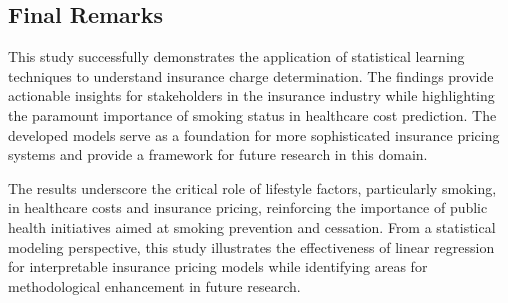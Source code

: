 \documentclass[12pt,a4paper]{article}
\begin{document}
\subsection{Final Remarks}

This study successfully demonstrates the application of statistical learning techniques to understand insurance charge determination. The findings provide actionable insights for stakeholders in the insurance industry while highlighting the paramount importance of smoking status in healthcare cost prediction. The developed models serve as a foundation for more sophisticated insurance pricing systems and provide a framework for future research in this domain.

The results underscore the critical role of lifestyle factors, particularly smoking, in healthcare costs and insurance pricing, reinforcing the importance of public health initiatives aimed at smoking prevention and cessation. From a statistical modeling perspective, this study illustrates the effectiveness of linear regression for interpretable insurance pricing models while identifying areas for methodological enhancement in future research.
\end{document}
